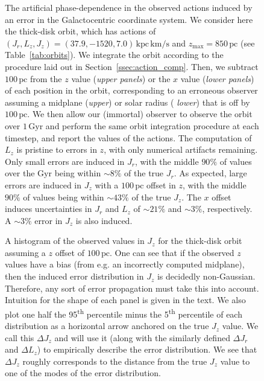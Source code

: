 \documentclass[twocolumn]{aastex62}
\newcommand{\pc}{\text{pc}}
\newcommand{\Gyr}{\text{Gyr}}
\newcommand{\kms}{\text{km}/\text{s}}
\newcommand{\actunit}{\text{kpc}\,\kms}
\newcommand{\uth}{\textsuperscript{th}}
\begin{document}
\begin{figure}
\caption{The artificial phase-dependence in the observed actions induced by an
error in the Galactocentric coordinate system. We consider here the thick-disk
orbit, which has actions of $(J_r, L_z, J_z) = (37.9, -1520, 7.0)\,\actunit$
and $z_{\text{max}}=850\,\pc$ (see Table~\ref{tab:orbits}). We integrate the
orbit according to the procedure laid out in Section~\ref{ssec:action_comp}.
Then, we subtract $100\,\pc$ from the $z$ value ({\em upper panels}) or the
$x$ value ({\em lower panels}) of each position in the orbit, corresponding to
an erroneous observer assuming a midplane ({\em upper}) or solar radius ({\em
lower}) that is off by $100\,\pc$. We then allow our (immortal) observer to
observe the orbit over $1\,\Gyr$ and perform the same orbit integration
procedure at each timestep, and report the values of the actions. The
computation of $L_z$ is pristine to errors in $z$, with only numerical
artifacts remaining. Only small errors are induced in $J_r$, with the middle
$90\%$ of values over the $\Gyr$ being within $\sim8\%$ of the true $J_r$. As
expected, large errors are induced in $J_z$ with a $100\,\pc$ offset in $z$,
with the middle $90\%$ of values being within $\sim43\%$ of the true $J_z$.
The $x$ offset induces uncertainties in $J_r$ and $L_z$ of $\sim21\%$ and
$\sim3\%$, respectively. A $\sim3\%$ error in $J_z$ is also induced.}
\label{fig:one_orbit_wrong_ref}
\end{figure}

\begin{figure}
\caption{A histogram of the observed values in $J_z$ for the thick-disk orbit
assuming a $z$ offset of $100\,\pc$. One can see that if the observed $z$
values have a bias (from e.g. an incorrectly computed midplane), then the
induced error distribution in $J_z$ is decidedly non-Gaussian. Therefore, any
sort of error propagation must take this into account. Intuition for the shape
of each panel is given in the text. We also plot one half the 95\uth{}
percentile minus the 5\uth{} percentile of each distribution as a horizontal
arrow anchored on the true $J_z$ value. We call this $\Delta J_z$ and will use
it (along with the similarly defined $\Delta J_r$ and $\Delta L_z$) to
empirically describe the error distribution. We see that $\Delta J_z$ roughly
corresponds to the distance from the true $J_z$ value to one of the modes of
the error distribution.}
\label{fig:Jz_hist}
\end{figure}
\end{document}
